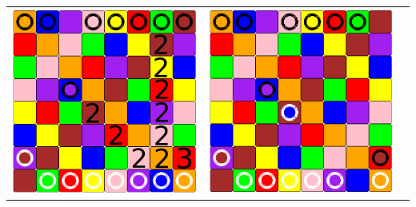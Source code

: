 \documentclass[a4paper, 11pt]{beamer}
\begin{document}
\begin{frame}
\begin{center}
\begin{tabular}{c c c}
    \includegraphics[scale = 0.12]{val_5.png} &
    \pause
    \includegraphics[scale = 0.12]{val_6.png} \\
   \end{tabular}
   
\end{center}
\end{frame}
\end{document}
